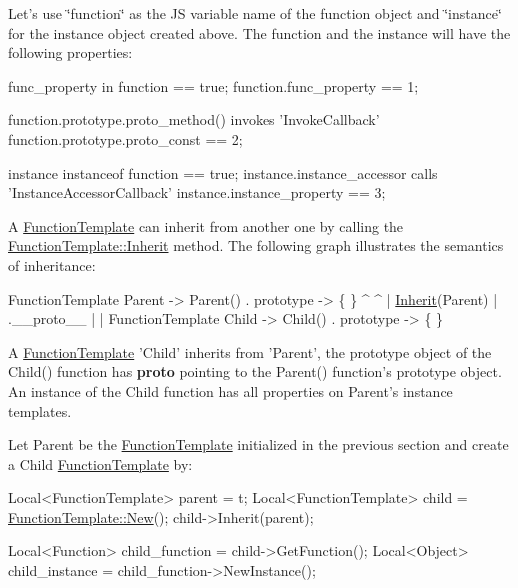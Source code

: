 Let's use \char`\"{}function\char`\"{} as the J\-S variable name of the function object and \char`\"{}instance\char`\"{} for the instance object created above. The function and the instance will have the following properties\-:


\begin{DoxyCode}
func\_property in \textcolor{keyword}{function} == \textcolor{keyword}{true};
\textcolor{keyword}{function}.func\_property == 1;

\textcolor{keyword}{function}.prototype.proto\_method() invokes \textcolor{stringliteral}{'InvokeCallback'}
\textcolor{keyword}{function}.prototype.proto\_const == 2;

instance instanceof \textcolor{keyword}{function} == \textcolor{keyword}{true};
instance.instance\_accessor calls \textcolor{stringliteral}{'InstanceAccessorCallback'}
instance.instance\_property == 3;
\end{DoxyCode}


A \hyperlink{classv8_1_1FunctionTemplate}{Function\-Template} can inherit from another one by calling the \hyperlink{classv8_1_1FunctionTemplate_a18f343e7e5749ed886d6e76a1424216e}{Function\-Template\-::\-Inherit} method. The following graph illustrates the semantics of inheritance\-:


\begin{DoxyCode}
FunctionTemplate Parent  -> Parent() . prototype -> \{ \}
  ^                                                  ^
  | \hyperlink{classv8_1_1FunctionTemplate_a18f343e7e5749ed886d6e76a1424216e}{Inherit}(Parent)                                  | .\_\_proto\_\_
  |                                                  |
FunctionTemplate Child   -> Child()  . prototype -> \{ \}
\end{DoxyCode}


A \hyperlink{classv8_1_1FunctionTemplate}{Function\-Template} 'Child' inherits from 'Parent', the prototype object of the Child() function has {\bfseries proto} pointing to the Parent() function's prototype object. An instance of the Child function has all properties on Parent's instance templates.

Let Parent be the \hyperlink{classv8_1_1FunctionTemplate}{Function\-Template} initialized in the previous section and create a Child \hyperlink{classv8_1_1FunctionTemplate}{Function\-Template} by\-:


\begin{DoxyCode}
Local<FunctionTemplate> parent = t;
Local<FunctionTemplate> child = \hyperlink{classv8_1_1FunctionTemplate_a67822fdf0ef2ac00e20e923e649f3f5f}{FunctionTemplate::New}();
child->Inherit(parent);

Local<Function> child\_function = child->GetFunction();
Local<Object> child\_instance = child\_function->NewInstance();
\end{DoxyCode}


